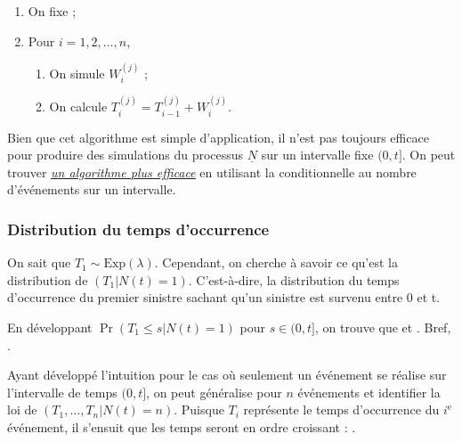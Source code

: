 \documentclass[10pt, french]{article}
\begin{document}
\begin{multicols*}{2}
\begin{algo2}
\begin{enumerate}
	\item	On fixe  ;
	\item	Pour $i	=	1, 2, \dots, n$, 
		\begin{enumerate}[label = \alph*)]
		\item	On simule $W_{i}^{(j)}$ ;
		\item	On calcule $T_{i}^{(j)}	=	T_{i - 1}^{(j)} + W_{i}^{(j)}$.
		\end{enumerate}
\end{enumerate}
\end{algo2}

\begin{rappel_enhanced}
Bien que cet algorithme est simple d'application, il n'est pas toujours efficace pour produire des simulations du processus $\underline{N}$ sur un intervalle fixe $(0, t]$. On peut trouver \textit{\color{bleudefrance}\underline{\hyperlink{PP2}{\color{bleudefrance} un algorithme plus efficace}}} en utilisant la \textit{\underline{}} conditionnelle au nombre d'événements sur un intervalle.
\end{rappel_enhanced}



\subsubsection{Distribution du temps d'occurrence}\label{subsubsec:OccurTimeDistrPP}
\begin{rappel_enhanced}[Contexte]
On sait que $T_{1} \sim \text{Exp}(\lambda)$. Cependant, on cherche à savoir ce qu'est la distribution de $(T_{1} | N(t) = 1)$. C'est-à-dire, la distribution du temps d'occurrence du premier sinistre sachant qu'un sinistre est survenu entre 0 et t. 
\end{rappel_enhanced}

En développant $\Pr(T_{1} \leq s | N(t) = 1)$ pour $s \in (0, t]$, on trouve que  et . Bref, .

\bigskip

Ayant développé l'intuition pour le cas où seulement un événement se réalise sur l'intervalle de temps $(0, t]$, on peut généralise pour $n$ événements et identifier la loi de $(T_{1}, \dots, T_{n} | N(t) = n)$. Puisque $T_{i}$ représente le temps d'occurrence du $i^{\text{e}}$ événement, il s'ensuit que les temps seront en ordre croissant : . 


\end{multicols*}
\end{document}
